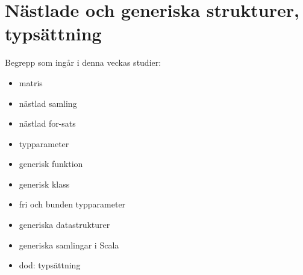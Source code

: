 \chapter{Nästlade och generiska strukturer, typsättning}\label{chapter:W08}
Begrepp som ingår i denna veckas studier:
\begin{itemize}[noitemsep,label={$\square$},leftmargin=*]
\item matris
\item nästlad samling
\item nästlad for-sats
\item typparameter
\item generisk funktion
\item generisk klass
\item fri och bunden typparameter
\item generiska datastrukturer
\item generiska samlingar i Scala
\item dod: typsättning\end{itemize}
